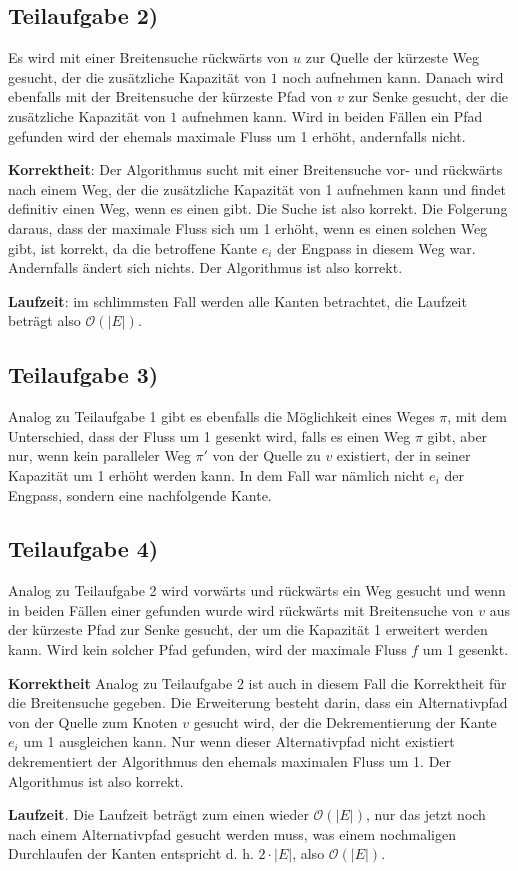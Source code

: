 \documentclass[a4paper, fontsize=10pt]{scrartcl}
\begin{document}
\subsection*{Teilaufgabe 2)}
Es wird mit einer Breitensuche rückwärts von $u$ zur Quelle der kürzeste Weg gesucht, der die zusätzliche Kapazität von $1$ noch aufnehmen kann. Danach wird ebenfalls mit der Breitensuche der kürzeste Pfad von $v$ zur Senke gesucht, der die zusätzliche Kapazität von $1$ aufnehmen kann. Wird in beiden Fällen ein Pfad gefunden wird der ehemals maximale Fluss um 1 erhöht, andernfalls nicht.\bigskip

\textbf{Korrektheit}: Der Algorithmus sucht mit einer Breitensuche vor- und rückwärts nach einem Weg, der die zusätzliche Kapazität von 1 aufnehmen kann und findet definitiv einen Weg, wenn es einen gibt. Die Suche ist also korrekt. Die Folgerung daraus, dass der maximale Fluss sich um 1 erhöht, wenn es einen solchen Weg gibt, ist korrekt, da die betroffene Kante $e_i$ der Engpass in diesem Weg war. Andernfalls ändert sich nichts. Der Algorithmus ist also korrekt.\bigskip

\textbf{Laufzeit}:
im schlimmsten Fall werden alle Kanten betrachtet, die Laufzeit beträgt also $\mathcal{O}(|E|)$.

\subsection*{Teilaufgabe 3)}
Analog zu Teilaufgabe 1 gibt es ebenfalls die Möglichkeit eines Weges $\pi$, mit dem Unterschied, dass der Fluss um 1 gesenkt wird, falls es einen Weg $\pi$ gibt, aber nur, wenn kein paralleler Weg $\pi'$ von der Quelle zu $v$ existiert, der in seiner Kapazität um 1 erhöht werden kann. In dem Fall war nämlich nicht $e_i$ der Engpass, sondern eine nachfolgende Kante.

\subsection*{Teilaufgabe 4)}
Analog zu Teilaufgabe 2 wird vorwärts und rückwärts ein Weg gesucht und wenn in beiden Fällen einer gefunden wurde wird rückwärts mit Breitensuche von $v$ aus der kürzeste Pfad zur Senke gesucht, der um die Kapazität 1 erweitert werden kann. Wird kein solcher Pfad gefunden, wird der maximale Fluss $f$ um 1 gesenkt.\bigskip

\textbf{Korrektheit} 
Analog zu Teilaufgabe 2 ist auch in diesem Fall die Korrektheit für die Breitensuche gegeben. Die Erweiterung besteht darin, dass ein Alternativpfad von der Quelle zum Knoten $v$ gesucht wird, der die Dekrementierung der Kante $e_i$ um 1 ausgleichen kann. Nur wenn dieser Alternativpfad nicht existiert dekrementiert der Algorithmus den ehemals maximalen Fluss um 1. Der Algorithmus ist also korrekt.\bigskip

\textbf{Laufzeit}. Die Laufzeit beträgt zum einen wieder $\mathcal{O}(|E|)$, nur das jetzt noch nach einem Alternativpfad gesucht werden muss, was einem nochmaligen Durchlaufen der Kanten entspricht d. h. $2\cdot |E|$, also $\mathcal{O}(|E|)$.
\end{document}
